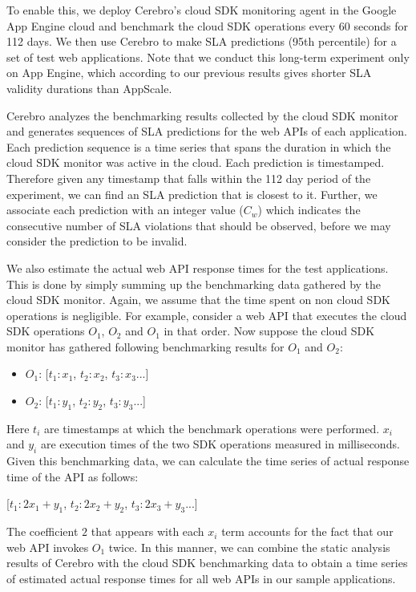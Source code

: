 To enable this, we deploy Cerebro's cloud 
SDK monitoring agent in the Google App Engine cloud and benchmark
the cloud SDK operations every 60 seconds for 112 days. We then use Cerebro
to make SLA predictions (95th percentile) for a set of test 
web applications. Note that we conduct this long-term experiment only on
App Engine, which according to our previous results gives shorter SLA
validity durations than AppScale.

Cerebro analyzes the benchmarking results collected
by the cloud SDK monitor and generates sequences of SLA predictions for the web APIs of each
application. Each prediction sequence
is a time series that spans the duration in which the cloud SDK monitor was active
in the cloud. Each prediction is timestamped. Therefore given any timestamp that falls within the
112 day period of the experiment, we can find an SLA prediction that is closest to it. 
Further, we associate each prediction with an integer value ($C_{w}$) which indicates the consecutive 
number of SLA violations that should be
observed, before we may consider the prediction to be invalid.

We also estimate the actual web API response times for the test applications. 
This is done by simply summing up the benchmarking data gathered by the cloud 
SDK monitor. Again, we assume that the time spent on non cloud SDK operations
is negligible. For example,
consider a web API that executes the cloud SDK operations $O_{1}$, $O_{2}$ and $O_{1}$ in that order. 
Now suppose the cloud SDK monitor has gathered following benchmarking results for $O_{1}$ and
$O_{2}$:

\begin{itemize}
\item $O_{1}$: [$t_{1}:x_{1}$, $t_{2}:x_{2}$, $t_{3}:x_{3}$...]
\item $O_{2}$: [$t_{1}:y_{1}$, $t_{2}:y_{2}$, $t_{3}:y_{3}$...]
\end{itemize}

Here $t_{i}$ are timestamps at which the benchmark operations were performed. $x_{i}$ and $y_{i}$ are
execution times of the two SDK operations measured in milliseconds. Given this benchmarking data,
we can calculate the time series of actual response time of the API as follows:

[$t_{1}:2x_{1}+y_{1}$, $t_{2}:2x_{2}+y_{2}$, $t_{3}:2x_{3}+y_{3}$...]

The coefficient $2$ that appears with each $x_{i}$ term accounts for the fact that our web API
invokes $O_{1}$ twice. In this manner, we can combine the static analysis
results of Cerebro with the cloud SDK benchmarking data to obtain a time series of estimated
actual response times for all web APIs in our sample applications.

